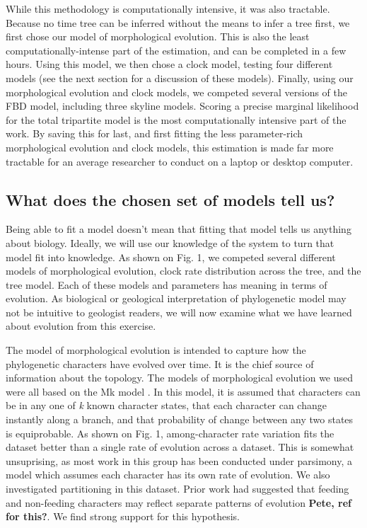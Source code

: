 \documentclass{article}
\begin{document}
While this methodology is computationally intensive, it was also tractable. 
Because no time tree can be inferred without the means to infer a tree first, we first chose our model of morphological evolution.
This is also the least computationally-intense part of the estimation, and can be completed in a few hours.
Using this model, we then chose a clock model, testing four different models (see the next section for a discussion of these models).
Finally, using our morphological evolution and clock models, we competed several versions of the FBD model, including three skyline models.
Scoring a precise marginal likelihood for the total tripartite model is the most computationally intensive part of the work. 
By saving this for last, and first fitting the less parameter-rich morphological evolution and clock models, this estimation is made far more tractable for an average researcher to conduct on a laptop or desktop computer. 



\subsection{What does the chosen set of models tell us?}

Being able to fit a model doesn't mean that fitting that model tells us anything about biology. 
Ideally, we will use our knowledge of the system to turn that model fit into knowledge. 
As shown on Fig. 1, we competed several different models of morphological evolution, clock rate distribution across the tree, and the tree model. 
Each of these models and parameters has meaning in terms of evolution. 
As biological or geological interpretation of phylogenetic model may not be intuitive to geologist readers, we will now examine what we have learned about evolution from this exercise.

The model of morphological evolution is intended to capture how the phylogenetic characters have evolved over time.
It is the chief source of information about the topology.
The models of morphological evolution we used were all based on the Mk model \citep{Lewis2001}. 
In this model, it is assumed that characters can be in any one of \textit{k} known character states, that each character can change instantly along a branch, and that probability of change between any two states is equiprobable.
As shown on Fig. 1, among-character rate variation fits the dataset better than a single rate of evolution across a dataset.
This is somewhat unsuprising, as most work in this group has been conducted under parsimony, a model which assumes each character has its own rate of evolution.
We also investigated partitioning in this dataset.
Prior work had suggested that feeding and non-feeding characters may reflect separate patterns of evolution \textbf{Pete, ref for this?}.
We find strong support for this hypothesis.
\end{document}
